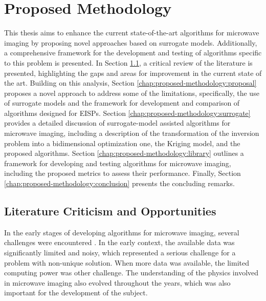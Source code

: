 
\chapter{Proposed Methodology}\label{chap:proposed-methodology}

	This thesis aims to enhance the current state-of-the-art algorithms for microwave imaging by proposing novel approaches based on surrogate models. Additionally, a comprehensive framework for the development and testing of algorithms specific to this problem is presented. In Section \ref{chap:proposed-methodology:criticism}, a critical review of the literature is presented, highlighting the gaps and areas for improvement in the current state of the art. Building on this analysis, Section \ref{chap:proposed-methodology:proposal} proposes a novel approach to address some of the limitations, specifically, the use of surrogate models and the framework for development and comparison of algorithms designed for EISPs. Section \ref{chap:proposed-methodology:surrogate} provides a detailed discussion of surrogate-model assisted algorithms for microwave imaging, including a description of the transformation of the inversion problem into a bidimensional optimization one, the Kriging model, and the proposed algorithms. Section \ref{chap:proposed-methodology:library} outlines a framework for developing and testing algorithms for microwave imaging, including the proposed metrics to assess their performance. Finally, Section \ref{chap:proposed-methodology:conclusion} presents the concluding remarks.

	\section{Literature Criticism and Opportunities}\label{chap:proposed-methodology:criticism}
	
		In the early stages of developing algorithms for microwave imaging, several challenges were encountered \citep{kirsch2011introduction,pastorino2000microwave,bertero2020introduction}. In the early context, the available data was significantly limited and noisy, which represented a serious challenge for a problem with non-unique solution. When more data was available, the limited computing power was other challenge. The understanding of the physics involved in microwave imaging also evolved throughout the years, which was also important for the development of the subject.
	
